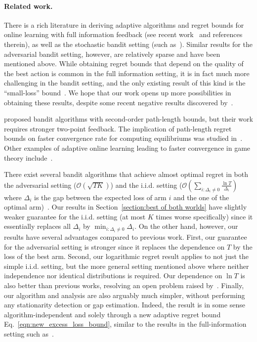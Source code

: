 \paragraph{Related work.}
There is a rich literature in deriving adaptive algorithms and regret bounds for online learning with full information feedback
(see recent work~\citep{luo2015achieving, koolen2015second, van2016metagrad, orabona2016coin, cutkosky2017online} and references therein),
as well as the stochastic bandit setting (such as~\citep{garivier2011kl, lattimore2015optimally, degenne2016anytime}).
Similar results for the adversarial bandit setting, however, are relatively sparse and have been mentioned above.
While obtaining regret bounds that depend on the quality of the best action is common in the full information setting,
it is in fact much more challenging in the bandit setting, 
and the only existing result of this kind is the ``small-loss'' bound~\citep{allenberg2006hannan, foster2016learning}.
We hope that our work opens up more possibilities in obtaining these results,
despite some recent negative results discovered by~\citet{gerchinovitz2016refined}.

\citet{chiang2013beating} proposed bandit algorithms with second-order path-length bounds, but their work requires stronger two-point feedback.
The implication of path-length regret bounds on faster convergence rate for computing equilibriums was studied in~\citep{syrgkanis2015fast}.
Other examples of adaptive online learning leading to faster convergence in game theory include~\citep{rakhlin2013optimization, daskalakis2015near, foster2016learning}.

There exist several bandit algorithms that achieve almost optimal regret in both the adversarial setting ($\mathcal{O}(\sqrt{TK})$) and 
the i.i.d. setting ($\mathcal{O}(\sum_{i: \Delta_i \neq 0}\frac{\ln T}{\Delta_i})$ where $\Delta_i$ is the gap between the expected loss of arm $i$ and the one of the optimal arm)~\citep{bubeck2012best, seldin2014one, auer2016algorithm, seldin2017improved}.
Our results in Section~\ref{section:best of both worlds} have slightly weaker guarantee for the i.i.d. setting (at most $K$ times worse specifically)
since it essentially replaces all $\Delta_i$ by $\min_{i: \Delta_i \neq 0} \Delta_i$.
On the other hand, however, our results have several advantages compared to previous work.
First, our guarantee for the adversarial setting is stronger since it replaces the dependence on $T$ by the loss of the best arm.
Second, our logarithmic regret result applies to not just the simple i.i.d. setting, 
but the more general setting mentioned above where neither independence nor identical distributions is required.
Our dependence on $\ln T$ is also better than previous works,
resolving an open problem raised by~\citet{seldin2017improved}.
Finally, our algorithm and analysis are also arguably much simpler, without performing any stationarity detection or gap estimation.
Indeed, the result is in some sense algorithm-independent and solely through a new adaptive regret bound Eq.~\eqref{eqn:new_excess_loss_bound},
similar to the results in the full-information setting such as~\citep{gaillard2014second}.

